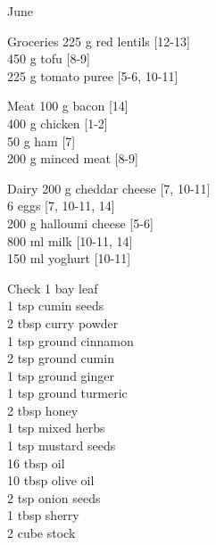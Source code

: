 \begin{menu}{June}
\begin{shoppinglist}{Groceries}
      225 g red lentils {\scriptsize[12-13]}\\
      450 g tofu {\scriptsize[8-9]}\\
      225 g tomato puree {\scriptsize[5-6, 10-11]}\\
      \end{shoppinglist}%
      \par\vfil %
      \begin{shoppinglist}{Meat}
      100 g bacon {\scriptsize[14]}\\
      400 g chicken {\scriptsize[1-2]}\\
      50 g ham {\scriptsize[7]}\\
      200 g minced meat {\scriptsize[8-9]}\\
      \end{shoppinglist}%
      \begin{shoppinglist}{Dairy}
      200 g cheddar cheese {\scriptsize[7, 10-11]}\\
      6  eggs {\scriptsize[7, 10-11, 14]}\\
      200 g halloumi cheese {\scriptsize[5-6]}\\
      800 ml milk {\scriptsize[10-11, 14]}\\
      150 ml yoghurt {\scriptsize[10-11]}\\
      \end{shoppinglist}%
      \par\vfil %
      \vfil\clearpage %
      \begin{shoppinglist}{Check}
      1  bay leaf \\
      1 tsp cumin seeds \\
      2 tbsp curry powder \\
      1 tsp ground cinnamon \\
      2 tsp ground cumin \\
      1 tsp ground ginger \\
      1 tsp ground turmeric \\
      2 tbsp honey \\
      1 tsp mixed herbs \\
      1 tsp mustard seeds \\
      16 tbsp oil \\
      10 tbsp olive oil \\
      2 tsp onion seeds \\
      1 tbsp sherry \\
      2 cube stock \\

\end{shoppinglist}
\end{menu}

